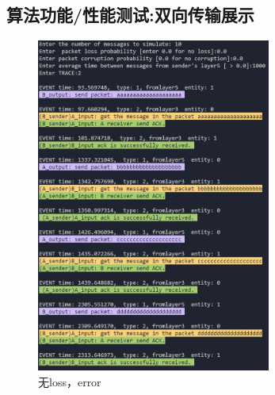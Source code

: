 \documentclass[UTF8,14pt]{article}
\numberwithin{figure}{section}
\begin{document}
\subsection{算法功能/性能测试:双向传输展示}
\vspace*{-0.5cm}
\begin{figure}[!htb]
      \centering
      \setlength{\abovecaptionskip}{0.cm}
      \includegraphics[width=7.70cm,height=11cm]{result1.png}
      \caption{无loss，error}
\end{figure}
\end{document}
